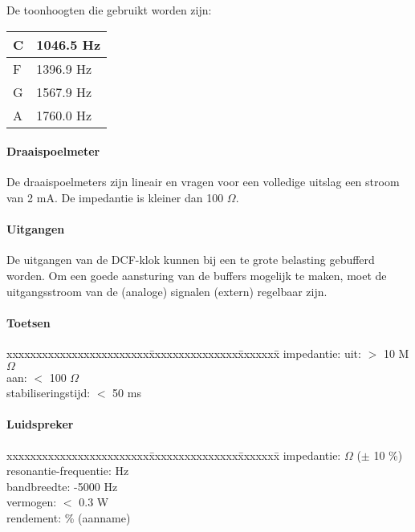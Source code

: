 De toonhoogten die gebruikt worden zijn:

\begin{tabular}{||l|l||} \hline
C & 1046.5 Hz \\ \hline
F & 1396.9 Hz \\ \hline
G & 1567.9 Hz \\ \hline
A & 1760.0 Hz \\ \hline
\end{tabular}


\paragraph{Draaispoelmeter}

De draaispoelmeters zijn lineair en vragen voor een volledige uitslag
een stroom van 2 mA. De impedantie is kleiner dan 100 $\Omega$.

\paragraph{Uitgangen}

De uitgangen van de DCF-klok kunnen bij een te grote belasting
gebufferd worden. Om een goede aansturing van de buffers mogelijk te
maken, moet de uitgangsstroom van de (analoge) signalen (extern) 
regelbaar zijn.

\paragraph{Toetsen}

\begin{tabbing}
xxxxxxxxxxxxxxxxxxxxxxxx\=xxxxxxxxxxxxxxx\=xxxxxxx\=\kill
impedantie:             \>uit:          \>$>$ 10 M$\Omega$\\
                        \>aan:          \>$<$ 100 $\Omega$\\
stabiliseringstijd:     \>$<$ 50 ms\\
\end{tabbing}


\paragraph{Luidspreker}

\begin{tabbing}
xxxxxxxxxxxxxxxxxxxxxxxx\=xxxxxxxxxxxxxxx\=xxxxxxx\=\kill
impedantie:              $\Omega$ ($\pm$ 10 \%)\\
resonantie-frequentie:   Hz\\
bandbreedte:            -5000 Hz\\
vermogen:               \>$<$ 0.3 W\\
rendement:               \% (aanname)\\
\end{tabbing}



